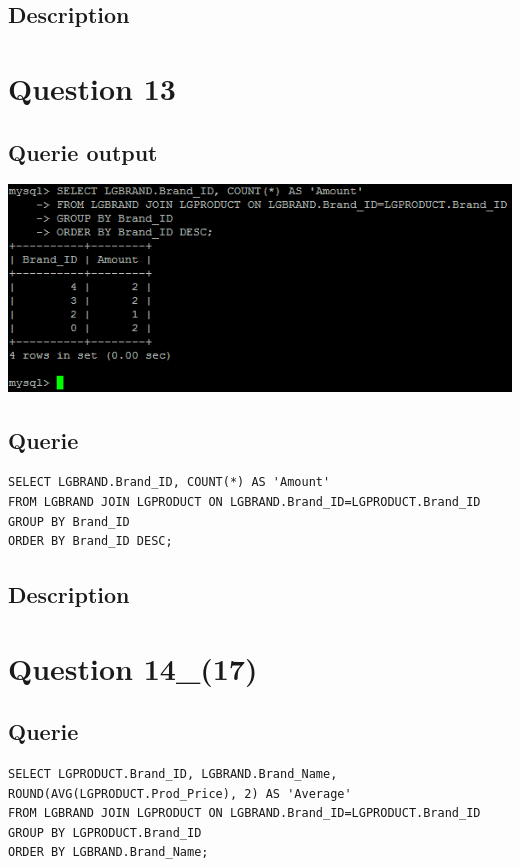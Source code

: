 \documentclass[a4paper,10pt]{article}
\begin{document}
\subsection{Description}\section*{Question 13}
\subsection{Querie output}
           \includegraphics{Queries/Question_13/Question_13_screenshot.PNG}
 \subsection{Querie}
          \lstset{
            language=SQL,
            breaklines=true
            }
        \begin{lstlisting}[frame=single]
        SELECT LGBRAND.Brand_ID, COUNT(*) AS 'Amount'
FROM LGBRAND JOIN LGPRODUCT ON LGBRAND.Brand_ID=LGPRODUCT.Brand_ID
GROUP BY Brand_ID
ORDER BY Brand_ID DESC;

        \end{lstlisting}
\subsection{Description}\section*{Question 14_(17)}
 \subsection{Querie}
          \lstset{
            language=SQL,
            breaklines=true
            }
        \begin{lstlisting}[frame=single]
        SELECT LGPRODUCT.Brand_ID, LGBRAND.Brand_Name, ROUND(AVG(LGPRODUCT.Prod_Price), 2) AS 'Average'
FROM LGBRAND JOIN LGPRODUCT ON LGBRAND.Brand_ID=LGPRODUCT.Brand_ID
GROUP BY LGPRODUCT.Brand_ID
ORDER BY LGBRAND.Brand_Name;

        \end{lstlisting}
\end{document}

